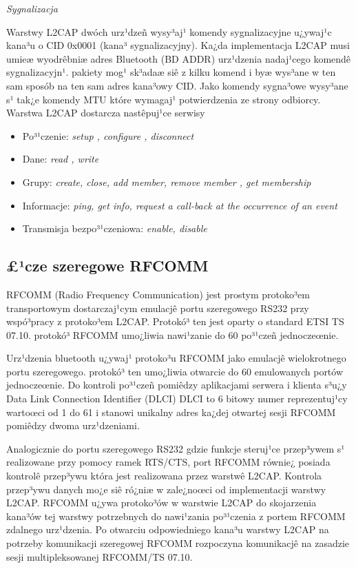  \emph{Sygnalizacja}

Warstwy L2CAP dwóch urz¹dzeñ wysy³aj¹ komendy sygnalizacyjne
u¿ywaj¹c kana³u o CID 0x0001 (kana³ sygnalizacyjny). Ka¿da
implementacja L2CAP musi umieæ wyodrêbniæ adres Bluetooth (BD ADDR)
urz¹dzenia nadaj¹cego komendê sygnalizacyjn¹. pakiety mog¹ sk³adaæ
siê z kilku komend i byæ wys³ane w ten sam sposób na ten sam adres
kana³owy CID. Jako komendy sygna³owe wysy³ane s¹ tak¿e komendy MTU
które wymagaj¹ potwierdzenia ze strony odbiorcy. Warstwa L2CAP
dostarcza nastêpuj¹ce serwisy

\begin{itemize}
  \item Po³¹czenie: \emph{setup , configure , disconnect}
  \item Dane: \emph{read  , write}
  \item Grupy: \emph{create, close, add member, remove member , get membership}
  \item Informacje: \emph{ping, get info, request a call-back at the occurrence of an event}
  \item Transmisja bezpo³¹czeniowa: \emph{enable, disable}
\end{itemize}

%
\subsection{£¹cze szeregowe RFCOMM}
\label{sec:Lacze szeregowe RFCOMM}
RFCOMM (Radio Frequency Communication) jest prostym protoko³em transportowym dostarczaj¹cym emulacjê portu szeregowego RS232 przy wspó³pracy z protoko³em L2CAP. Protokó³ ten jest oparty o standard ETSI TS 07.10. protokó³ RFCOMM
umo¿liwia nawi¹zanie do 60 po³¹czeñ jednoczeœnie.

Urz¹dzenia bluetooth u¿ywaj¹ protoko³u RFCOMM jako emulacjê
wielokrotnego portu szeregowego. protokó³ ten umo¿liwia otwarcie do
60 emulowanych portów jednoczeœnie. Do kontroli po³¹czeñ pomiêdzy
aplikacjami serwera i klienta s³u¿y Data Link Connection Identifier
(DLCI) DLCI to 6 bitowy numer reprezentuj¹cy wartoœci od 1 do 61 i
stanowi unikalny adres ka¿dej otwartej sesji RFCOMM pomiêdzy dwoma
urz¹dzeniami.

 Analogicznie do portu szeregowego RS232 gdzie funkcje
steruj¹ce przep³ywem s¹ realizowane przy pomocy ramek RTS/CTS, port
RFCOMM równie¿ posiada kontrolê przep³ywu która jest realizowana
przez warstwê L2CAP. Kontrola przep³ywu danych mo¿e siê ró¿niæ w
zale¿noœci od implementacji warstwy L2CAP. RFCOMM u¿ywa protoko³ów w
warstwie L2CAP do skojarzenia kana³ów tej warstwy potrzebnych do
nawi¹zania po³¹czenia z portem RFCOMM zdalnego urz¹dzenia. Po
otwarciu odpowiedniego kana³u warstwy L2CAP na potrzeby komunikacji
szeregowej RFCOMM rozpoczyna komunikacjê na zasadzie sesji
multipleksowanej RFCOMM/TS 07.10.

